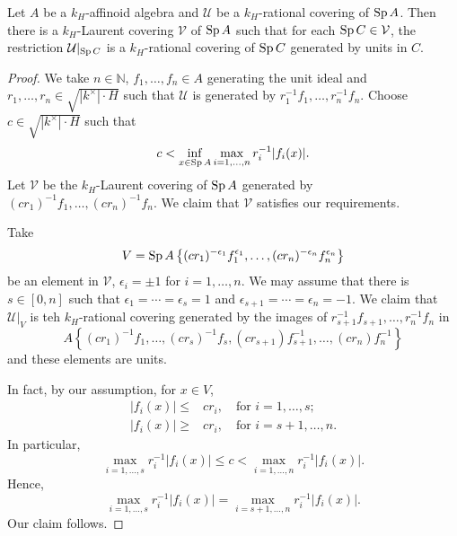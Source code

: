 \begin{lemma}\label{lma-prooftatelma2}
    Let $A$ be a $k_H$-affinoid algebra and $\mathcal{U}$ be a $k_H$-rational covering of $\operatorname{Sp} A$. Then there is a $k_H$-Laurent covering $\mathcal{V}$ of $\operatorname{Sp} A$ such that for each $\operatorname{Sp} C\in \mathcal{V}$, the restriction $\mathcal{U}|_{\operatorname{Sp} C}$ is a $k_H$-rational covering of $\operatorname{Sp} C$ generated by units in $C$.
\end{lemma}
\begin{proof}
    We take $n\in \mathbb{N}$, $f_1,\ldots,f_n\in A$ generating the unit ideal and $r_1,\ldots,r_n\in \sqrt{|k^{\times}|\cdot H}$ such that $\mathcal{U}$ is generated by $r_1^{-1}f_1,\ldots,r_n^{-1}f_n$. Choose $c\in \sqrt{|k^{\times}|\cdot H}$ such that
    \[
        c<\inf_{x\in \operatorname{Sp} A} \max_{i=1,\ldots,n}r_i^{-1}|f_i(x)|.  
    \]
    Let $\mathcal{V}$ be the $k_H$-Laurent covering of $\operatorname{Sp} A$ generated by $(cr_1)^{-1}f_1,\ldots,(cr_n)^{-1}f_n$. We claim that $\mathcal{V}$ satisfies our requirements.

    Take 
    \[
        V=\operatorname{Sp} A\left\{(cr_1)^{-\epsilon_1}f_1^{\epsilon_1},\ldots,(cr_n)^{-\epsilon_n}f_n^{\epsilon_n}\right\}  
    \]
    be an element in $\mathcal{V}$, $\epsilon_i=\pm 1$ for $i=1,\ldots,n$. We may assume that there is $s\in [0,n]$ such that $\epsilon_1=\cdots=\epsilon_s=1$ and $\epsilon_{s+1}=\cdots=\epsilon_n=-1$.  We claim that $\mathcal{U}|_V$ is teh $k_H$-rational covering generated by the images of $r_{s+1}^{-1}f_{s+1},\ldots,r_n^{-1}f_n$ in
    \[
        A\left\{ (cr_1)^{-1}f_1,\ldots,(cr_s)^{-1}f_s,(cr_{s+1})f_{s+1}^{-1},\ldots,(cr_n)f_n^{-1}\right\}
    \]
    and these elements are units.

    In fact, by our assumption, for $x\in V$,
    \[
         \begin{aligned}
                |f_i(x)|\leq & cr_i,\quad \text{for }i=1,\ldots,s;\\
                |f_i(x)|\geq & cr_i,\quad \text{for }i=s+1,\ldots,n.
         \end{aligned} 
    \]
    In particular,
    \[
         \max_{i=1,\ldots,s}r_i^{-1}|f_i(x)|\leq c< \max_{i=1,\ldots,n} r_i^{-1}|f_i(x)|.
    \]
    Hence, 
    \[
        \max_{i=1,\ldots,s}r_i^{-1}|f_i(x)|=\max_{i=s+1,\ldots,n}r_i^{-1}|f_i(x)|.
    \]
    Our claim follows.
\end{proof}

